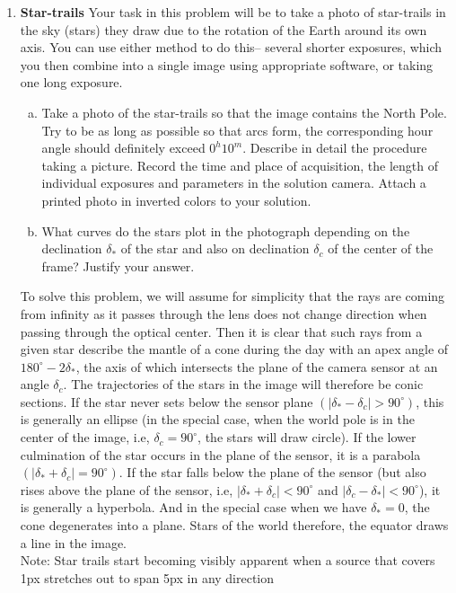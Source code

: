 \documentclass[a4paper,12pt]{extarticle}
\begin{document}
\begin{enumerate}
\item \textbf{Star-trails} Your task in this problem will be to take a photo of star-trails in the sky (stars) they draw due to the rotation of the Earth around its own axis. You can use either method to do this-- several shorter exposures, which you then combine into a single image using appropriate software, or taking one long exposure.
\begin{enumerate}[(a)]
	\itemsep0em 
	\item Take a photo of the star-trails so that the image contains the North Pole. Try to be as long as possible so that arcs form, the corresponding hour angle should definitely exceed $0^h10^m$. Describe in detail the procedure taking a picture. Record the time and place of acquisition, the length of individual exposures and parameters in the solution camera. Attach a printed photo in inverted colors to your solution.
	\item What curves do the stars plot in the photograph depending on the declination $\delta_\ast$ of the star and also on
	declination $\delta_c$ of the center of the frame? Justify your answer.
\end{enumerate}

\begin{sol}
To solve this problem, we will assume for simplicity that the rays are coming from infinity as it passes through the lens does not change direction when passing through the optical center. Then it is clear that such rays from a given star describe the mantle of a cone during the day
with an apex angle of $180^\circ - 2\delta_\ast$, the axis of which intersects the plane of the camera sensor at an angle
$\delta_c$. The trajectories of the stars in the image will therefore be conic sections. If the star never sets
below the sensor plane $(|\delta_\ast-\delta_c|> 90^\circ)$, this is generally an ellipse (in the special case, when the world pole is in the center of the image, i.e, $\delta_c = 90^\circ$, the stars will draw circle). If the lower culmination of the star occurs in the plane of the sensor, it is a parabola  $(|\delta_\ast+\delta_c|=90^\circ)$. If the star falls below the plane of the sensor (but also rises above
the plane of the sensor, i.e,  $|\delta_\ast +\delta_c|< 90^\circ$ and  $|\delta_c- \delta_\ast|< 90^\circ$), it is generally a hyperbola. And in the special case when we have $\delta_\ast = 0$, the cone degenerates into a plane. Stars of the world therefore, the equator draws a line in the image.\\

Note: Star trails start becoming visibly apparent when a source that covers 1px stretches out to span 5px in any direction
\end{sol}
\end{enumerate}
\end{document}

